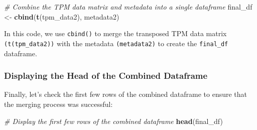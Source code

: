 \documentclass[
]{book}
\newenvironment{Shaded}{\begin{snugshade}}{\end{snugshade}}
\newcommand{\CommentTok}[1]{\textcolor[rgb]{0.56,0.35,0.01}{\textit{#1}}}
\newcommand{\FunctionTok}[1]{\textcolor[rgb]{0.13,0.29,0.53}{\textbf{#1}}}
\newcommand{\NormalTok}[1]{#1}
\newcommand{\OtherTok}[1]{\textcolor[rgb]{0.56,0.35,0.01}{#1}}
\begin{document}
\begin{Shaded}
\begin{Highlighting}[]
\CommentTok{\# Combine the TPM data matrix and metadata into a single dataframe}
\NormalTok{final\_df }\OtherTok{\textless{}{-}} \FunctionTok{cbind}\NormalTok{(}\FunctionTok{t}\NormalTok{(tpm\_data2), metadata2)}
\end{Highlighting}
\end{Shaded}

In this code, we use \texttt{cbind()} to merge the transposed TPM data matrix \texttt{(t(tpm\_data2))} with the metadata \texttt{(metadata2)} to create the \texttt{final\_df} dataframe.

\hypertarget{displaying-the-head-of-the-combined-dataframe}{%
\subsubsection{Displaying the Head of the Combined Dataframe}\label{displaying-the-head-of-the-combined-dataframe}}

Finally, let's check the first few rows of the combined dataframe to ensure that the merging process was successful:

\begin{Shaded}
\begin{Highlighting}[]
\CommentTok{\# Display the first few rows of the combined dataframe}
\FunctionTok{head}\NormalTok{(final\_df)}
\end{Highlighting}
\end{Shaded}
\end{document}
